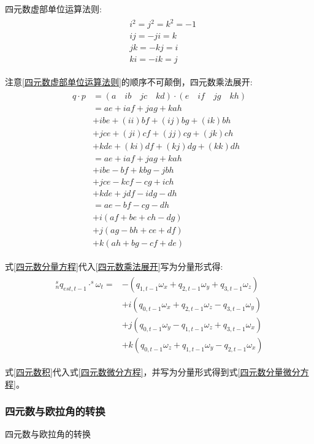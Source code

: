 \documentclass[12pt,a4paper]{article}
\begin{document}
四元数虚部单位运算法则:
\begin{eqnarray}\label{四元数虚部单位运算法则}
    \begin{split}
        &i^2=j^2=k^2=-1 \\
        &ij=-ji=k \\
        &jk=-kj=i \\
        &ki=-ik=j
    \end{split}
\end{eqnarray} 

注意\ref{四元数虚部单位运算法则}的顺序不可颠倒，四元数乘法展开:
\begin{eqnarray}\label{四元数乘法展开}
    \begin{split}
        q\cdot p
        &=(a\quad ib\quad jc\quad kd)\cdot(e\quad if\quad jg\quad kh) \\
        &= ae+   iaf+   jag+   kah \\
        &+ibe+(ii)bf+(ij)bg+(ik)bh \\
        &+jce+(ji)cf+(jj)cg+(jk)ch \\
        &+kde+(ki)df+(kj)dg+(kk)dh \\
        &= ae+iaf+jag+kah \\
        &+ibe- bf+kbg-jbh \\
        &+jce-kcf- cg+ich \\
        &+kde+jdf-idg- dh \\
        &=  ae-bf-cg-dh \\
        &+i(af+be+ch-dg) \\
        &+j(ag-bh+ce+df) \\
        &+k(ah+bg-cf+de)
    \end{split}
\end{eqnarray} 

式\ref{四元数分量方程}代入\ref{四元数乘法展开}写为分量形式得:
\begin{eqnarray}\label{四元数积}
    \begin{split} 
        ^s_nq_{est,t-1}\cdot^s\omega_t=&-(q_{1,t-1}\omega_x+q_{2,t-1}\omega_y+q_{3,t-1}\omega_z) \\
                                       &+i(q_{0,t-1}\omega_x+q_{2,t-1}\omega_z-q_{3,t-1}\omega_y) \\
                                       &+j(q_{0,t-1}\omega_y-q_{1,t-1}\omega_z+q_{3,t-1}\omega_x) \\
                                       &+k(q_{0,t-1}\omega_z+q_{1,t-1}\omega_y-q_{2,t-1}\omega_x)
    \end{split}
\end{eqnarray} 

式\ref{四元数积}代入式\ref{四元数微分方程}，并写为分量形式得到式\ref{四元数分量微分方程}。

\subsubsection{四元数与欧拉角的转换}\label{section:四元数与欧拉角的转换}
四元数与欧拉角的转换

\newpage
\renewcommand\refname{参考文献}
\centering %


\end{document}
